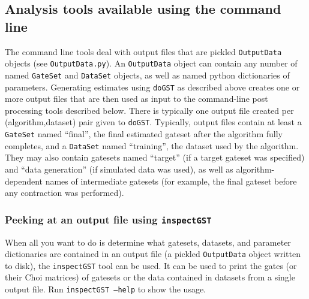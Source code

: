 \documentclass{article}[11pt]
\begin{document}

\subsection{Analysis tools available using the command line}
The command line tools deal with output files that are pickled \texttt{OutputData} objects (see \texttt{OutputData.py}).  An \texttt{OutputData} object can contain any number of named \texttt{GateSet} and \texttt{DataSet} objects, as well as named python dictionaries of parameters.  Generating estimates using \texttt{doGST} as described above creates one or more output files that are then used as input to the command-line post processing tools described below.  There is typically one output file created per (algorithm,dataset) pair given to \texttt{doGST}.  Typically, output files contain at least a \texttt{GateSet} named ``final'', the final estimated gateset after the algorithm fully completes, and a \texttt{DataSet} named ``training'', the dataset used by the algorithm. They may also contain gatesets named ``target'' (if a target gateset was specified) and ``data generation'' (if simulated data was used), as well as algorithm-dependent names of intermediate gatesets (for example, the final gateset before any contraction was performed).

\subsubsection{Peeking at an output file using \texttt{inspectGST}}
When all you want to do is determine what gatesets, datasets, and parameter dictionaries are contained in an output file (a pickled \texttt{OutputData} object written to disk), the \texttt{inspectGST} tool can be used.  It can be used to print the gates (or their Choi matrices) of gatesets or the data contained in datasets from a single output file.  Run \texttt{inspectGST --help} to show the usage.
\end{document}

